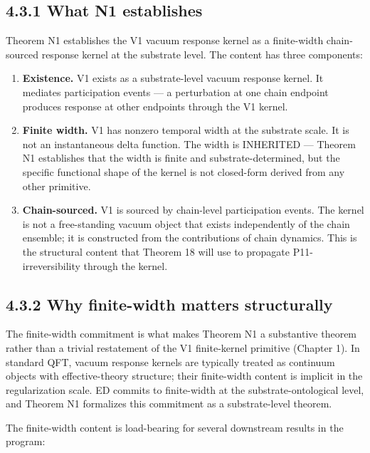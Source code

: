 \documentclass[11pt]{book}
\begin{document}
\subsection{4.3.1 What N1 establishes}

Theorem N1 establishes the V1 vacuum response kernel as a finite-width chain-sourced response kernel at the substrate level. The content has three components:

\begin{enumerate}
\item \textbf{Existence.} V1 exists as a substrate-level vacuum response kernel. It mediates participation events — a perturbation at one chain endpoint produces response at other endpoints through the V1 kernel.
\item \textbf{Finite width.} V1 has nonzero temporal width at the substrate scale. It is not an instantaneous delta function. The width is INHERITED — Theorem N1 establishes that the width is finite and substrate-determined, but the specific functional shape of the kernel is not closed-form derived from any other primitive.
\item \textbf{Chain-sourced.} V1 is sourced by chain-level participation events. The kernel is not a free-standing vacuum object that exists independently of the chain ensemble; it is constructed from the contributions of chain dynamics. This is the structural content that Theorem 18 will use to propagate P11-irreversibility through the kernel.
\end{enumerate}

\subsection{4.3.2 Why finite-width matters structurally}

The finite-width commitment is what makes Theorem N1 a substantive theorem rather than a trivial restatement of the V1 finite-kernel primitive (Chapter 1). In standard QFT, vacuum response kernels are typically treated as continuum objects with effective-theory structure; their finite-width content is implicit in the regularization scale. ED commits to finite-width at the substrate-ontological level, and Theorem N1 formalizes this commitment as a substrate-level theorem.

The finite-width content is load-bearing for several downstream results in the program:
\end{document}

